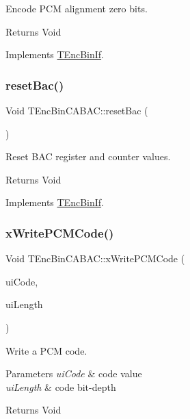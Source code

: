 Encode P\+CM alignment zero bits. \begin{DoxyReturn}{Returns}
Void 
\end{DoxyReturn}


Implements \hyperlink{class_t_enc_bin_if}{T\+Enc\+Bin\+If}.

\mbox{\label{class_t_enc_bin_c_a_b_a_c_aa1ae237265463d981de9a6cdbd1be2d3}} 
\subsubsection{\texorpdfstring{reset\+Bac()}{resetBac()}}
{\footnotesize\ttfamily Void T\+Enc\+Bin\+C\+A\+B\+A\+C\+::reset\+Bac (\begin{DoxyParamCaption}{ }\end{DoxyParamCaption})\hspace{0.3cm}{\ttfamily [virtual]}}

Reset B\+AC register and counter values. \begin{DoxyReturn}{Returns}
Void 
\end{DoxyReturn}


Implements \hyperlink{class_t_enc_bin_if}{T\+Enc\+Bin\+If}.

\mbox{\label{class_t_enc_bin_c_a_b_a_c_a07980c0398a2aa75dab8b4e5d19f67aa}} 
\subsubsection{\texorpdfstring{x\+Write\+P\+C\+M\+Code()}{xWritePCMCode()}}
{\footnotesize\ttfamily Void T\+Enc\+Bin\+C\+A\+B\+A\+C\+::x\+Write\+P\+C\+M\+Code (\begin{DoxyParamCaption}\item[{U\+Int}]{ui\+Code,  }\item[{U\+Int}]{ui\+Length }\end{DoxyParamCaption})\hspace{0.3cm}{\ttfamily [virtual]}}

Write a P\+CM code. 
\begin{DoxyParams}{Parameters}
{\em ui\+Code} & code value \\
\hline
{\em ui\+Length} & code bit-\/depth \\
\hline
\end{DoxyParams}
\begin{DoxyReturn}{Returns}
Void 
\end{DoxyReturn}


